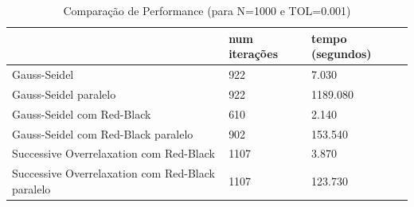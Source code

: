 \documentclass[a4paper]{report}
\begin{document}
\begin{table}[h]
\centering
\begin{tabular}{|l|l|l|}
\hline
                                                 & num iterações & tempo (segundos) \\ \hline
Gauss-Seidel                                     & 922           & 7.030            \\ \hline
Gauss-Seidel paralelo                            & 922           & 1189.080         \\ \hline
Gauss-Seidel com Red-Black                       & 610           & 2.140                 \\ \hline
Gauss-Seidel com Red-Black paralelo              & 902           & 153.540                 \\ \hline
Successive Overrelaxation com Red-Black          & 1107          & 3.870            \\ \hline
Successive Overrelaxation com Red-Black paralelo & 1107          & 123.730          \\ \hline
\end{tabular}
\caption{Comparação de Performance (para N=1000 e TOL=0.001)}
\label{tab:tempo}
\end{table}
\end{document}
